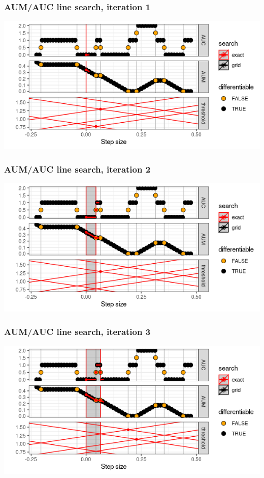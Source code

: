 
\begin{frame}
  \frametitle{AUM/AUC line search, iteration 1}
  \includegraphics[width=\textwidth]{figure-line-search-example-1}
\end{frame}


\begin{frame}
  \frametitle{AUM/AUC line search, iteration 2}
  \includegraphics[width=\textwidth]{figure-line-search-example-2}
\end{frame}


\begin{frame}
  \frametitle{AUM/AUC line search, iteration 3}
  \includegraphics[width=\textwidth]{figure-line-search-example-3}
\end{frame}


